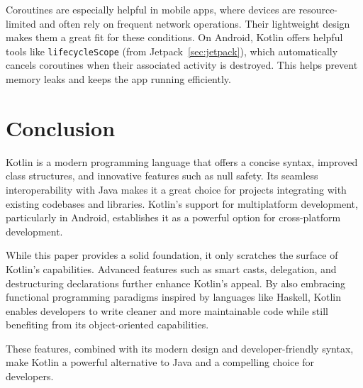 \documentclass[a4paper,11pt]{article}
\begin{document}
Coroutines are especially helpful in mobile apps, where devices are resource-limited and often rely on frequent network operations. Their lightweight design makes them a great fit for these conditions. On Android, Kotlin offers helpful tools like \texttt{lifecycleScope} (from Jetpack~\autoref{sec:jetpack}), which automatically cancels coroutines when their associated activity is destroyed. This helps prevent memory leaks and keeps the app running efficiently.

\section{Conclusion}
Kotlin is a modern programming language that offers a concise syntax, improved class structures, and innovative features such as null safety. Its seamless interoperability with Java makes it a great choice for projects integrating with existing codebases and libraries. Kotlin's support for multiplatform development, particularly in Android, establishes it as a powerful option for cross-platform development.

While this paper provides a solid foundation, it only scratches the surface of Kotlin's capabilities. Advanced features such as smart casts, delegation, and destructuring declarations further enhance Kotlin's appeal. By also embracing functional programming paradigms inspired by languages like Haskell, Kotlin enables developers to write cleaner and more maintainable code while still benefiting from its object-oriented capabilities.

These features, combined with its modern design and developer-friendly syntax, make Kotlin a powerful alternative to Java and a compelling choice for developers.

\newpage
\printbibliography[]
\end{document}
